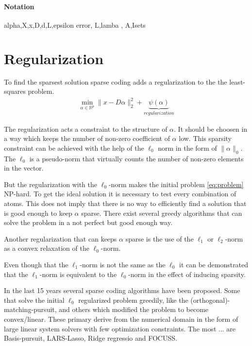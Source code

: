 \paragraph{Notation}
alpha,X,x,D,d,L,epsilon error, L,lamba , A,Isets

\section{Regularization}
To find the sparsest solution sparse coding adds a regularization to the
the least-squares problem. 
\begin{align}
\min_{\alpha\in\mathbb{R}^{p}} \lVert x - D\alpha \rVert^{2}_{2} + \underbrace{\psi(\alpha)}_{regularization}
\end{align}

The regularization acts a constraint to the structure of $\alpha$. It should be
choosen in a way which keeps the number of non-zero coefficient of $\alpha$ low.
This sparsity constraint can be achieved with the help of the $\ell_0$ norm in
the form of $\lVert\alpha\rVert_{0}$. The $\ell_0$ is a pseudo-norm that
virtually counts the number of non-zero elements in the vector.

But the regularization with the $\ell_0$-norm makes the initial problem
\ref{eq:problem} NP-hard. To get the ideal solution it is necessary to test
every combination of atoms. This does not imply that there is no way to
efficiently find a solution that is good enough to keep $\alpha$ sparse.
There exist several greedy algorithms that can solve the problem in a
not perfect but good enough way. 

Another regularization that can keeps $\alpha$ sparse is the use of the $\ell_1$
or $\ell_2$-norm as a convex relaxation of the $\ell_0$-norm.

Even though that the $\ell_1$-norm is not the same as the $\ell_0$ it can
be demonstrated that the $\ell_1$-norm is equivalent to the $\ell_0$-norm in
the effect of inducing sparsity.


In the last 15 years several sparse coding algorithms have been proposed. Some
that solve the initial $\ell_0$ regularized problem greedily, like
the (orthogonal)-matching-pursuit, and others which modified the problem to
become convex/linear. These primary derive from the numerical domain in the form
of large linear system solvers with few optimization constraints. The most
... are Basis-pursuit, LARS-Lasso, Ridge regressio and FOCUSS.


